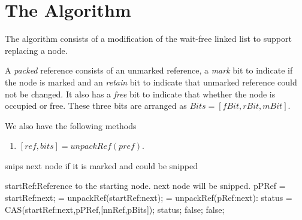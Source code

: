 \documentclass[11pt,onecolumn]{IEEEtran}
\begin{document}
\section{The Algorithm}
The algorithm consists of a modification of the wait-free linked list to support replacing a node.

A {\it packed} reference consists of an unmarked reference, a {\it mark} bit to indicate if the node is marked and an {\it retain} bit to indicate that unmarked reference could not be changed. It also has a {\it free} bit to indicate that whether the node is occupied or free. These three bits are arranged as $Bits = [fBit,rBit,mBit]$.

We also have the following methods

\begin{enumerate}
    \item $[ref, bits] = unpackRef(pref)$.
\end{enumerate} 

\begin{algorithm}
  \caption{snips next node if it is marked and could be snipped}
  \label{alg:snip}
  
  \begin{algorithmic}[1]
    \Require
        \Statex startRef:Reference to the starting node.
    \Ensure
       \Statex next node will be snipped.
    \Statex   
      \State pPRef = startRef:next;
       = unpackRef(startRef:next);
         = unpackRef(pRef:next):
          \State status = CAS(startRef:next,pPRef,[nnRef,pBits]);
          \State
          \Return status;
        \Else
          \State
          \Return false;
        \EndIf
      \Else
        \State
        \Return false;
      \EndIf
    \EndFunction
  \end{algorithmic}
\end{algorithm}
\end{document}
